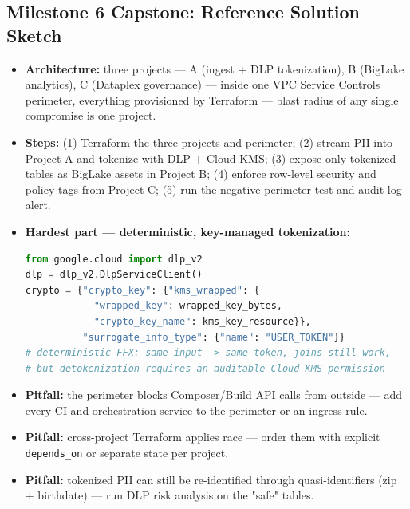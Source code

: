 \documentclass[11pt, a4paper]{article}
\begin{document}
\subsection*{Milestone 6 Capstone: Reference Solution Sketch}
\begin{itemize}[label=-, leftmargin=1.5em]
    \item \textbf{Architecture:} three projects --- A (ingest + DLP tokenization), B (BigLake analytics), C (Dataplex governance) --- inside one VPC Service Controls perimeter, everything provisioned by Terraform --- blast radius of any single compromise is one project.
    \item \textbf{Steps:} (1) Terraform the three projects and perimeter; (2) stream PII into Project A and tokenize with DLP + Cloud KMS; (3) expose only tokenized tables as BigLake assets in Project B; (4) enforce row-level security and policy tags from Project C; (5) run the negative perimeter test and audit-log alert.
    \item \textbf{Hardest part --- deterministic, key-managed tokenization:}
\begin{lstlisting}[language=Python]
from google.cloud import dlp_v2
dlp = dlp_v2.DlpServiceClient()
crypto = {"crypto_key": {"kms_wrapped": {
            "wrapped_key": wrapped_key_bytes,
            "crypto_key_name": kms_key_resource}},
          "surrogate_info_type": {"name": "USER_TOKEN"}}
# deterministic FFX: same input -> same token, joins still work,
# but detokenization requires an auditable Cloud KMS permission
\end{lstlisting}
    \item \textbf{Pitfall:} the perimeter blocks Composer/Build API calls from outside --- add every CI and orchestration service to the perimeter or an ingress rule.
    \item \textbf{Pitfall:} cross-project Terraform applies race --- order them with explicit \texttt{depends\_on} or separate state per project.
    \item \textbf{Pitfall:} tokenized PII can still be re-identified through quasi-identifiers (zip + birthdate) --- run DLP risk analysis on the "safe" tables.
\end{itemize}
\end{document}
